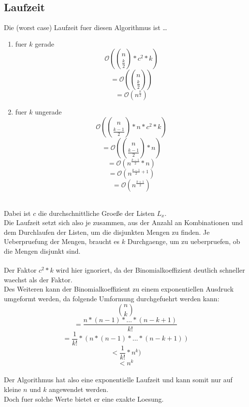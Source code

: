 \documentclass[a4paper,10pt,ngerman]{scrartcl}
\begin{document}
\subsection{Laufzeit}
Die (worst case) Laufzeit fuer diesen Algorithmus ist \dots
\begin{enumerate}
	\item fuer $k$ gerade
	$$
	\mathcal{O}(\binom{n}{\frac{k}{2}} * c^2 * k) 
	$$
	$$
	= \mathcal{O}(\binom{n}{\frac{k}{2}})
	$$
	$$
	= \mathcal{O}(n^{\frac{k}{2}}) 
	$$

	\item fuer $k$ ungerade
	$$
	\mathcal{O}(\binom{n}{\frac{k-1}{2}} * n * c^2 * k) 
	$$
	$$
	= \mathcal{O}(\binom{n}{\frac{k-1}{2}} * n) 
	$$
	$$
	= \mathcal{O}(n^{\frac{k-1}{2}} * n) 
	$$
	$$
	= \mathcal{O}(n^{\frac{k-1}{2} + 1}) 
	$$
	$$
	= \mathcal{O}(n^{\frac{k+1}{2}}) 
	$$
\end{enumerate}
\\
Dabei ist $c$ die durchschnittliche Groeße der Listen $L_x$.\\
Die Laufzeit setzt sich also je zusammen, aus der Anzahl an Kombinationen und dem Durchlaufen der Listen, um die disjunkten Mengen zu finden. Je Ueberpruefung der Mengen, 
braucht es $k$ Durchgaenge, um zu ueberpruefen, ob die Mengen disjunkt sind.
\\\\
Der Faktor $c^2 * k$ wird hier ignoriert, da der Binomialkoeffizient deutlich schneller waechst als der Faktor.\\
Des Weiteren kann der Binomialkoeffizient zu einem exponentiellen Ausdruck umgeformt werden, da folgende Umformung durchgefuehrt werden kann:\\
$$ \binom{n}{k} $$
$$ = \frac{n * (n-1) * \dots * (n-k+1)}{k!} $$
$$ = \frac{1}{k!} * (n * (n-1) * \dots * (n-k+1)) $$
$$ < \frac{1}{k!} * n^k) $$
$$ < n^k $$
\\
Der Algorithmus hat also eine exponentielle Laufzeit und kann somit nur auf kleine $n$ und $k$ angewendet werden. \\
Doch fuer solche Werte bietet er eine exakte Loesung.
\end{document}
